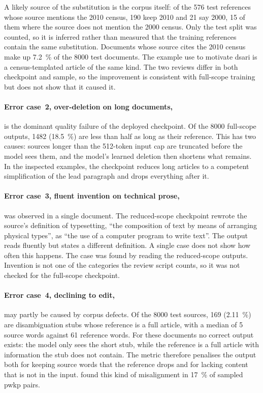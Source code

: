 A likely source of the substitution is the corpus itself: of the \num{576} test references whose source mentions the 2010 census, \num{190} keep 2010 and 21 say 2000, 15 of them where the source does not mention the 2000 census.
Only the test split was counted, so it is inferred rather than measured that the training references contain the same substitution.
Documents whose source cites the 2010 census make up \qty{7.2}{\percent} of the \num{8000} test documents.
The example \textcite[8001--8002]{sun-etal-2021-document} use to motivate \gls{dsari} is a census-templated article of the same kind.
The two reviews differ in both checkpoint and sample, so the improvement is consistent with full-scope training but does not show that it caused it.

\paragraph{Error case~2, over-deletion on long documents,} is the dominant quality failure of the deployed checkpoint.
Of the \num{8000} full-scope outputs, \num{1482} (\qty{18.5}{\percent}) are less than half as long as their reference.
This has two causes: sources longer than the \num{512}-token input cap are truncated before the model sees them, and the model's learned deletion then shortens what remains.
In the inspected examples, the checkpoint reduces long articles to a competent simplification of the lead paragraph and drops everything after it.

\paragraph{Error case~3, fluent invention on technical prose,} was observed in a single document.
The reduced-scope checkpoint rewrote the source's definition of typesetting, ``the composition of text by means of arranging physical types'', as ``the use of a computer program to write text''.
The output reads fluently but states a different definition.
A single case does not show how often this happens.
The case was found by reading the reduced-scope outputs.
Invention is not one of the categories the review script counts, so it was not checked for the full-scope checkpoint.

\paragraph{Error case~4, declining to edit,} may partly be caused by corpus defects.
Of the \num{8000} test sources, \num{169} (\qty{2.11}{\percent}) are disambiguation stubs whose reference is a full article, with a median of 5 source words against 61 reference words.
For these documents no correct output exists: the model only sees the short stub, while the reference is a full article with information the stub does not contain.
The metric therefore penalises the output both for keeping source words that the reference drops and for lacking content that is not in the input.
\textcite[285]{xu-etal-2015-problems} found this kind of misalignment in \qty{17}{\percent} of sampled \gls{pwkp} pairs.

